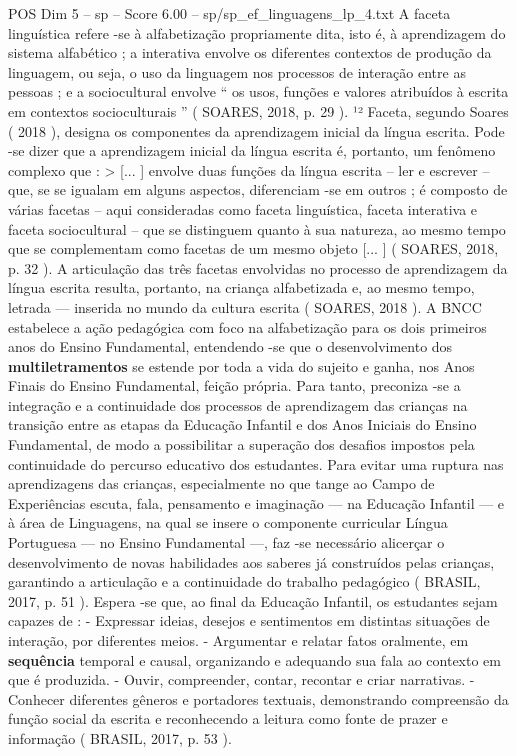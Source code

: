 \begin{textsample}{POS Dim 5 – sp – Score 6.00 – sp/sp\_ef\_linguagens\_lp\_4.txt}
A faceta linguística refere -se à alfabetização propriamente dita, isto é, à aprendizagem do sistema alfabético ; a interativa envolve os diferentes contextos de produção da linguagem, ou seja, o uso da linguagem nos processos de interação entre as pessoas ; e a sociocultural envolve “ os usos, funções e valores atribuídos à escrita em contextos socioculturais ” ( SOARES, 2018, p. 29 ). ¹² Faceta, segundo Soares ( 2018 ), designa os componentes da aprendizagem inicial da língua escrita.
Pode -se dizer que a aprendizagem inicial da língua escrita é, portanto, um fenômeno complexo que : > [... ] envolve duas funções da língua escrita – ler e escrever – que, se se igualam em alguns aspectos, diferenciam -se em outros ; é composto de várias facetas – aqui consideradas como faceta linguística, faceta interativa e faceta sociocultural – que se distinguem quanto à sua natureza, ao mesmo tempo que se complementam como facetas de um mesmo objeto [... ] ( SOARES, 2018, p. 32 ).
A articulação das três facetas envolvidas no processo de aprendizagem da língua escrita resulta, portanto, na criança alfabetizada e, ao mesmo tempo, letrada — inserida no mundo da cultura escrita ( SOARES, 2018 ).
A BNCC estabelece a ação pedagógica com foco na alfabetização para os dois primeiros anos do Ensino Fundamental, entendendo -se que o desenvolvimento dos \textbf{multiletramentos} se estende por toda a vida do sujeito e ganha, nos Anos Finais do Ensino Fundamental, feição própria.
Para tanto, preconiza -se a integração e a continuidade dos processos de aprendizagem das crianças na transição entre as etapas da Educação Infantil e dos Anos Iniciais do Ensino Fundamental, de modo a possibilitar a superação dos desafios impostos pela continuidade do percurso educativo dos estudantes.
Para evitar uma ruptura nas aprendizagens das crianças, especialmente no que tange ao Campo de Experiências escuta, fala, pensamento e imaginação — na Educação Infantil — e à área de Linguagens, na qual se insere o componente curricular Língua Portuguesa — no Ensino Fundamental —, faz -se necessário alicerçar o desenvolvimento de novas habilidades aos saberes já construídos pelas crianças, garantindo a articulação e a continuidade do trabalho pedagógico ( BRASIL, 2017, p. 51 ).
Espera -se que, ao final da Educação Infantil, os estudantes sejam capazes de : - Expressar ideias, desejos e sentimentos em distintas situações de interação, por diferentes meios. - Argumentar e relatar fatos oralmente, em \textbf{sequência} temporal e causal, organizando e adequando sua fala ao contexto em que é produzida. - Ouvir, compreender, contar, recontar e criar narrativas. - Conhecer diferentes gêneros e portadores textuais, demonstrando compreensão da função social da escrita e reconhecendo a leitura como fonte de prazer e informação ( BRASIL, 2017, p. 53 ).

\end{textsample}
